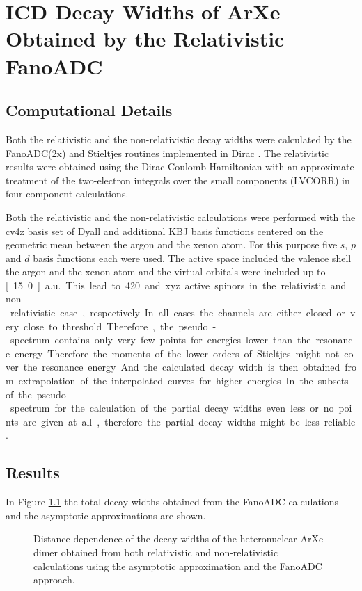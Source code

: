 \chapter{ICD Decay Widths of ArXe Obtained by the Relativistic FanoADC}
\label{chapter:fano_arxe}
\section{Computational Details}
Both the relativistic and the non-relativistic decay widths were calculated by
the FanoADC(2x) and Stieltjes routines implemented in Dirac \cite{DIRAC13}.
The relativistic results were obtained using the
Dirac-Coulomb Hamiltonian with an approximate treatment of the two-electron
integrals over the small components (LVCORR)
in four-component calculations.

Both the relativistic and the non-relativistic calculations were performed
with the cv4z basis set of Dyall \cite{} and additional \ac{KBJ} \cite{Kaufmann89}
basis functions centered on the geometric mean between the argon and the xenon
atom. For this purpose five $s$, $p$ and $d$ basis functions each were used.
The active space included the valence shell the argon and the xenon atom and
the virtual orbitals were included up to \unit[15.0]{a.u.}. 
This lead to 420 and xyz active spinors in the relativistic and non-relativistic
case, respectively.

In all cases the channels are either closed or very close to threshold.
Therefore, the pseudo-spectrum contains only very few points for energies
lower than the resonance energy. Therefore the moments of the lower orders of
Stieltjes might not cover the resonance energy. And the calculated decay width
is then obtained from extrapolation of the interpolated curves for higher energies.
In the subsets of the pseudo-spectrum for the
calculation of the partial decay widths even less or no points are given at all,
therefore the partial decay widths might be less reliable.


\section{Results}
In Figure \ref{figure:arxe_gamma_shift_fano} the total decay widths obtained
from the FanoADC calculations and the asymptotic approximations are shown.

\begin{figure}[]
  \centering
  
  \caption{Distance dependence of the decay widths of the heteronuclear
           ArXe dimer obtained from both relativistic and non-relativistic
           calculations using the asymptotic approximation and the FanoADC
           approach.}
  \label{figure:arxe_gamma_shift_fano}
\end{figure}


